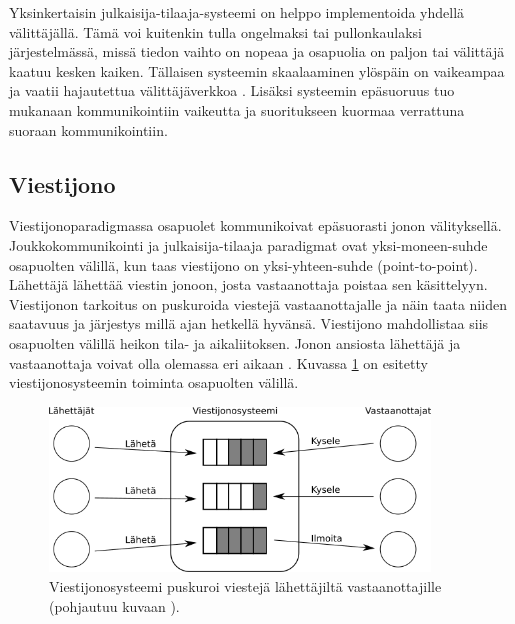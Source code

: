 Yksinkertaisin julkaisija-tilaaja-systeemi on helppo implementoida yhdellä välittäjällä. Tämä voi kuitenkin tulla ongelmaksi tai pullonkaulaksi järjestelmässä, missä tiedon vaihto on nopeaa ja osapuolia on paljon tai välittäjä kaatuu kesken kaiken. Tällaisen systeemin skaalaaminen ylöspäin on vaikeampaa ja vaatii hajautettua välittäjäverkkoa \cite[s.~248--249]{distributed-systems-concepts-and-design}. Lisäksi systeemin epäsuoruus tuo mukanaan kommunikointiin vaikeutta ja suoritukseen kuormaa verrattuna suoraan kommunikointiin.


\subsection{Viestijono}
Viestijonoparadigmassa osapuolet kommunikoivat epäsuorasti jonon välityksellä. Joukkokommunikointi ja julkaisija-tilaaja paradigmat ovat yksi-moneen-suhde osapuolten välillä, kun taas viestijono on yksi-yhteen-suhde (point-to-point). Lähettäjä lähettää viestin jonoon, josta vastaanottaja poistaa sen käsittelyyn. Viestijonon tarkoitus on puskuroida viestejä vastaanottajalle ja näin taata niiden saatavuus ja järjestys millä ajan hetkellä hyvänsä. Viestijono mahdollistaa siis osapuolten välillä heikon tila- ja aikaliitoksen. Jonon ansiosta lähettäjä ja vastaanottaja voivat olla olemassa eri aikaan \cite[s.~254]{distributed-systems-concepts-and-design}. Kuvassa \ref{fig:message-queue-communication} on esitetty viestijonosysteemin toiminta osapuolten välillä.

\begin{figure}[ht!]
	\includegraphics[width=0.9\textwidth]{pictures/message-queue.png}
	\caption{Viestijonosysteemi puskuroi viestejä lähettäjiltä vastaanottajille (pohjautuu kuvaan \mbox{\cite[s.~255]{distributed-systems-concepts-and-design}}).}
	\label{fig:message-queue-communication}
\end{figure}

